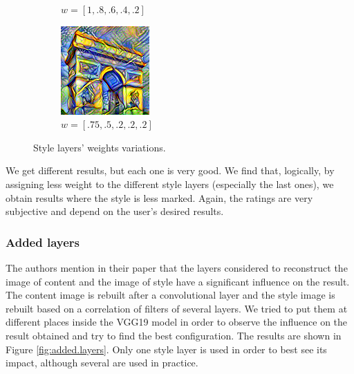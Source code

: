 \documentclass[twocolumn,superscriptaddress,aps,floatfix, nofootinbib]{revtex4-1}
\begin{document}
\begin{figure}[ht]
\begin{subfigure}[b]{0.13\textwidth}
            \caption{$w = [1, .8, .6, .4, .2]$}
        \end{subfigure}
        \hfill
        \begin{subfigure}[b]{0.13\textwidth}
            \centering
            \includegraphics[width=\textwidth]{resources/png/weights/sun-trees-paris-high-decreasing-weights.png}
            \caption{$w = [.75, .5, .2, .2, .2]$}
        \end{subfigure}
        \caption{Style layers' weights variations.}
        \label{fig:weights.style.layers}
    \end{figure}
    
    We get different results, but each one is very good. We find that, logically, by assigning less weight to the different style layers (especially the last ones), we obtain results where the style is less marked. Again, the ratings are very subjective and depend on the user's desired results.
    
    \subsubsection{Added layers}
    
    The authors mention in their paper that the layers considered to reconstruct the image of content and the image of style have a significant influence on the result. The content image is rebuilt after a convolutional layer and the style image is rebuilt based on a correlation of filters of several layers. We tried to put them at different places inside the VGG19 model in order to observe the influence on the result obtained and try to find the best configuration. The results are shown in Figure \ref{fig:added.layers}. Only one style layer is used in order to best see its impact, although several are used in practice.
    
\end{document}
